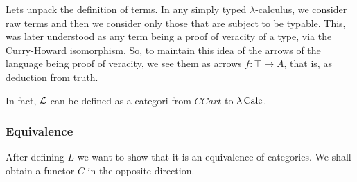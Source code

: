 \begin{remark}
  Lets unpack the definition of terms. In any simply typed $\lambda$-calculus, we consider raw terms and then we consider only those that are subject to be typable. This, was later understood as any term being a proof of veracity of a type, via the Curry-Howard isomorphism. So, to maintain this idea of the arrows of the language being proof of veracity, we see them as arrows $f:\top \to A$, that is, as deduction from truth.
 \end{remark}


 In fact, $\mathcal{L} $ can be defined as a categori from $CCart$ to $\lambda\operatorname{Calc}$. 



\subsubsection{Equivalence}
After defining $L$ we want to show that it is an equivalence of categories. We shall obtain a functor $C$ in the opposite direction.  






